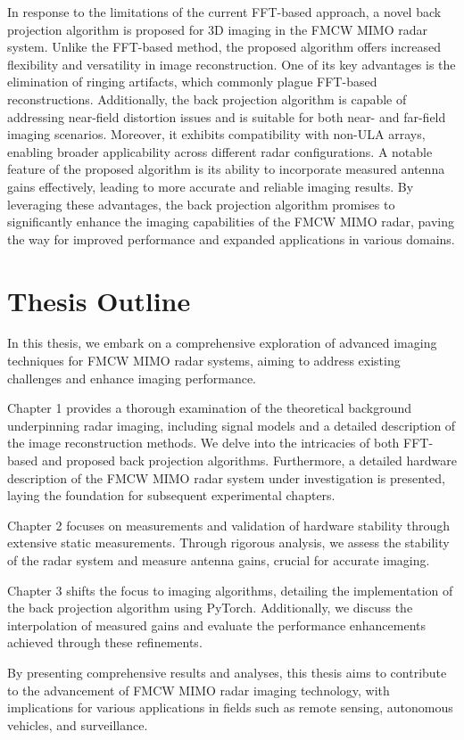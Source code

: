 In response to the limitations of the current FFT-based approach,
a novel back projection algorithm is proposed for 3D imaging in the FMCW MIMO radar system.
Unlike the FFT-based method, the proposed algorithm offers increased flexibility and versatility in image reconstruction.
One of its key advantages is the elimination of ringing artifacts, which commonly plague FFT-based reconstructions.
Additionally, the back projection algorithm is capable of addressing near-field distortion issues and is suitable
for both near- and far-field imaging scenarios. Moreover, it exhibits compatibility with non-ULA arrays,
enabling broader applicability across different radar configurations. A notable feature of the proposed algorithm
is its ability to incorporate measured antenna gains effectively, leading to more accurate and reliable imaging results.
By leveraging these advantages, the back projection algorithm promises to significantly enhance the imaging capabilities of the FMCW MIMO radar,
paving the way for improved performance and expanded applications in various domains. \\

\section{Thesis Outline}
In this thesis, we embark on a comprehensive exploration of advanced imaging techniques for FMCW MIMO radar systems,
aiming to address existing challenges and enhance imaging performance.

Chapter 1 provides a thorough examination of
the theoretical background underpinning radar imaging, including signal models and a detailed description of the image reconstruction methods.
We delve into the intricacies of both FFT-based and proposed back projection algorithms.
Furthermore, a detailed hardware description of the FMCW MIMO radar system under investigation is presented,
laying the foundation for subsequent experimental chapters.

Chapter 2 focuses on measurements and validation of hardware stability
through extensive static measurements. Through rigorous analysis, we assess the stability of the radar system and measure antenna gains,
crucial for accurate imaging.

Chapter 3 shifts the focus to imaging algorithms, detailing the implementation of the back projection algorithm using PyTorch.
Additionally, we discuss the interpolation of measured gains and evaluate the performance enhancements achieved through these refinements.

By presenting comprehensive results and analyses, this thesis aims to contribute to the advancement of FMCW MIMO radar imaging technology,
with implications for various applications in fields such as remote sensing, autonomous vehicles, and surveillance.

